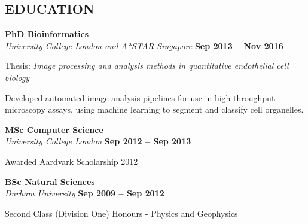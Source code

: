 \documentclass[margin,line]{resume}
\begin{document}
\begin{resume}
    \section{\mysidestyle \textbf{\large{E}\small{DUCATION}}}

    \vspace{1mm}

    \textbf{\listing PhD Bioinformatics} \vspace{2mm}\\\vspace{1mm}%
    \textsl{University College London and A*STAR Singapore} \hfill \textbf{Sep 2013 -- Nov 2016}\vspace{-3mm}\\\vspace{-1mm}%
    \begin{list2}
        \item Thesis: \emph{Image processing and analysis methods in quantitative endothelial cell biology}
	\item Developed automated image analysis pipelines for use in high-throughput microscopy assays, using machine learning to segment and classify cell organelles.
    \end{list2}\vspace{-1.5mm}

    \textbf{\listing MSc Computer Science} \vspace{2mm}\\\vspace{1mm}%
    \textsl{University College London} \hfill \textbf{Sep 2012 -- Sep 2013}\vspace{-3mm}\\\vspace{-1mm}%
    \begin{list2}
        \item Awarded Aardvark Scholarship 2012
    \end{list2}\vspace{-1.5mm}

    \textbf{\listing BSc Natural Sciences} \vspace{2mm}\\\vspace{1mm}%
    \textsl{Durham University} \hfill \textbf{Sep 2009 -- Sep 2012}\vspace{-3mm}\\\vspace{-1mm}%
    \begin{list2}
        \item Second Class (Division One) Honours - Physics and Geophysics
    \end{list2}\vspace{-1.5mm}


\end{resume}
\end{document}
